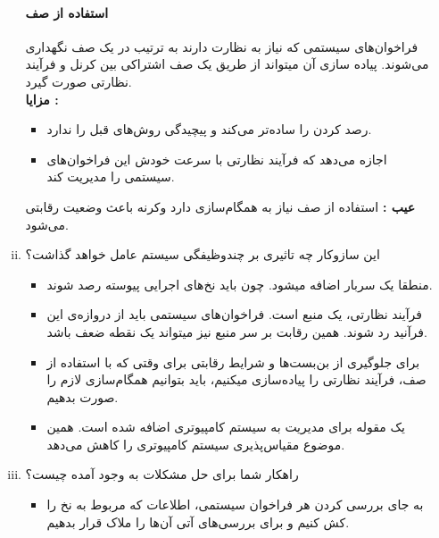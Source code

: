 \documentclass[]{article}
\begin{document}
\begin{enumerate}[(A)]
\begin{enumerate}[i.]
                        \paragraph*{استفاده از صف }
                        فراخوان‌های سیستمی که نیاز به نظارت دارند به ترتیب در یک صف نگهداری می‌شوند.
                        پیاده‌ سازی آن میتواند از طریق یک صف اشتراکی بین کرنل و فرآیند نظارتی صورت گیرد.
                        \\
                        \textbf{مزایا : }
                        \begin{itemize}
                              \renewcommand\labelitemi{-}
                              \item رصد کردن را ساده‌تر می‌کند و پیچیدگی روش‌های قبل را ندارد.
                              \item اجازه می‌دهد که فرآیند نظارتی با سرعت خودش این فراخوان‌های سیستمی را مدیریت کند.
                        \end{itemize}
                        \textbf{عیب : } استفاده از صف نیاز به همگام‌سازی دارد وکرنه باعث وضعیت رقابتی می‌شود.
                  \item ﺍﯾﻦ ﺳﺎﺯﻭﮐﺎﺭ ﭼﻪ ﺗﺎﺛﯿﺮﯼ ﺑﺮ ﭼﻨﺪﻭﻇﯿﻔﮕﯽ ﺳﯿﺴﺘﻢ ﻋﺎﻣﻞ ﺧﻮﺍﻫﺪ ﮔﺬﺍﺷﺖ؟
                        \begin{itemize}
                              \renewcommand\labelitemi{-}
                              \item منطقا یک سربار اضافه میشود. چون باید نخ‌های اجرایی پیوسته رصد شوند.
                              \item فرآیند نظارتی، یک منبع است. فراخوان‌های سیستمی باید از دروازه‌ی این فرآنید رد شوند. همین رقابت بر سر منبع نیز میتواند یک نقطه‌ ضعف باشد.
                              \item برای جلوگیری از بن‌بست‌ها  و شرایط رقابتی  برای وقتی که با استفاده از صف، فرآیند نظارتی را پیاده‌سازی میکنیم، باید بتوانیم همگام‌سازی لازم را صورت بدهیم.
                              \item  یک مقوله‌ برای مدیریت به سیستم کامپیوتری اضافه شده است. همین موضوع  مقیاس‌پذیری سیستم کامپیوتری را کاهش می‌دهد.
                        \end{itemize}
                  \item ﺭﺍﻫﮑﺎﺭ ﺷﻤﺎ ﺑﺮﺍﯼ ﺣﻞ ﻣﺸﮑﻼﺕ ﺑﻪ ﻭﺟﻮﺩ ﺁﻣﺪﻩ ﭼﯿﺴﺖ؟
                        \begin{itemize}
                              \renewcommand\labelitemi{-}
                              \item به جای بررسی کردن هر فراخوان سیستمی، اطلاعات که مربوط به نخ را کش کنیم و برای بررسی‌های آتی آن‌ها را ملاک قرار بدهیم.

\end{itemize}
\end{enumerate}
\end{enumerate}
\end{document}

